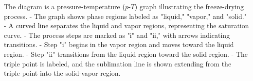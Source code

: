 The diagram is a pressure-temperature (\(p\)-\(T\)) graph illustrating the freeze-drying process.  
- The graph shows phase regions labeled as "liquid," "vapor," and "solid."  
- A curved line separates the liquid and vapor regions, representing the saturation curve.  
- The process steps are marked as "i" and "ii," with arrows indicating transitions.  
- Step "i" begins in the vapor region and moves toward the liquid region.  
- Step "ii" transitions from the liquid region toward the solid region.  
- The triple point is labeled, and the sublimation line is shown extending from the triple point into the solid-vapor region.